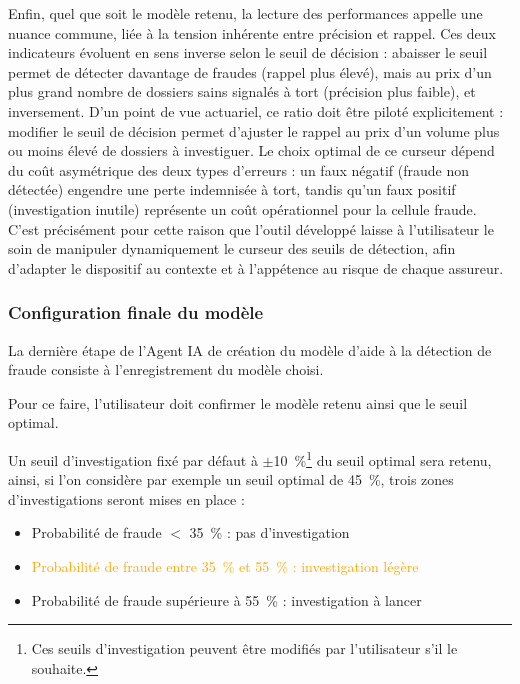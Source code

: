 Enfin, quel que soit le modèle retenu, la lecture des performances appelle une nuance commune, liée à la tension inhérente entre précision et rappel. Ces deux indicateurs évoluent en sens inverse selon le seuil de décision : abaisser le seuil permet de détecter davantage de fraudes (rappel plus élevé), mais au prix d'un plus grand nombre de dossiers sains signalés à tort (précision plus faible), et inversement. D'un point de vue actuariel, ce ratio doit être piloté explicitement : modifier le seuil de décision permet d'ajuster le rappel au prix d'un volume plus ou moins élevé de dossiers à investiguer. Le choix optimal de ce curseur dépend du coût asymétrique des deux types d'erreurs : un faux négatif (fraude non détectée) engendre une perte indemnisée à tort, tandis qu'un faux positif (investigation inutile) représente un coût opérationnel pour la cellule fraude. C'est précisément pour cette raison que l'outil développé laisse à l'utilisateur le soin de manipuler dynamiquement le curseur des seuils de détection, afin d'adapter le dispositif au contexte et à l'appétence au risque de chaque assureur.

\subsubsection*{Configuration finale du modèle}

La dernière étape de l'Agent IA de création du modèle d'aide à la détection de fraude consiste à l'enregistrement du modèle choisi.

Pour ce faire, l'utilisateur doit confirmer le modèle retenu ainsi que le seuil optimal.

Un seuil d'investigation fixé par défaut à $\pm$10~\%\footnote{Ces seuils d'investigation peuvent être modifiés par l'utilisateur s'il le souhaite.} du seuil optimal sera retenu, ainsi, si l'on considère par exemple un seuil optimal de 45~\%, trois zones d'investigations seront mises en place :

\begin{itemize}[label = $\bullet$]
    \item \textcolor{vert}{Probabilité de fraude $<$ 35~\% : pas d'investigation}
    \item \textcolor{orange}{Probabilité de fraude entre 35~\% et 55~\% : investigation légère}
    \item \textcolor{rouge}{Probabilité de fraude supérieure à 55~\% : investigation à lancer}
\end{itemize}

